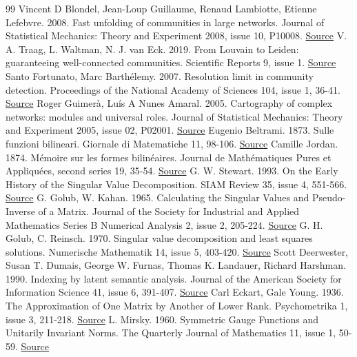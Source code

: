 \documentclass[10pt,letterpaper]{article}
\begin{document}
\begin{thebibliography}{99}
Vincent D Blondel, Jean-Loup Guillaume, Renaud Lambiotte, Etienne Lefebvre. 2008. Fast unfolding of communities in large networks. Journal of Statistical Mechanics: Theory and Experiment 2008, issue 10, P10008. \href{https://doi.org/10.1088/1742-5468/2008/10/P10008}{Source}
V. A. Traag, L. Waltman, N. J. van Eck. 2019. From Louvain to Leiden: guaranteeing well-connected communities. Scientific Reports 9, issue 1. \href{https://doi.org/10.1038/s41598-019-41695-z}{Source}
Santo Fortunato, Marc Barthélemy. 2007. Resolution limit in community detection. Proceedings of the National Academy of Sciences 104, issue 1, 36-41. \href{https://doi.org/10.1073/pnas.0605965104}{Source}
Roger Guimerà, Luís A Nunes Amaral. 2005. Cartography of complex networks: modules and universal roles. Journal of Statistical Mechanics: Theory and Experiment 2005, issue 02, P02001. \href{https://doi.org/10.1088/1742-5468/2005/02/P02001}{Source}
Eugenio Beltrami. 1873. Sulle funzioni bilineari. Giornale di Matematiche 11, 98-106. \href{https://www-users.cse.umn.edu/~boley/publications/papers/Beltrami.pdf}{Source}
Camille Jordan. 1874. Mémoire sur les formes bilinéaires. Journal de Mathématiques Pures et Appliquées, second series 19, 35-54. \href{http://www.numdam.org/item/JMPA_1874_2_19__35_0/}{Source}
G. W. Stewart. 1993. On the Early History of the Singular Value Decomposition. SIAM Review 35, issue 4, 551-566. \href{https://doi.org/10.1137/1035134}{Source}
G. Golub, W. Kahan. 1965. Calculating the Singular Values and Pseudo-Inverse of a Matrix. Journal of the Society for Industrial and Applied Mathematics Series B Numerical Analysis 2, issue 2, 205-224. \href{https://doi.org/10.1137/0702016}{Source}
G. H. Golub, C. Reinsch. 1970. Singular value decomposition and least squares solutions. Numerische Mathematik 14, issue 5, 403-420. \href{https://doi.org/10.1007/BF02163027}{Source}
Scott Deerwester, Susan T. Dumais, George W. Furnas, Thomas K. Landauer, Richard Harshman. 1990. Indexing by latent semantic analysis. Journal of the American Society for Information Science 41, issue 6, 391-407. \href{https://doi.org/10.1002/%28SICI%291097-4571%28199009%2941:6%3C391::AID-ASI1%3E3.0.CO%3B2-9}{Source}
Carl Eckart, Gale Young. 1936. The Approximation of One Matrix by Another of Lower Rank. Psychometrika 1, issue 3, 211-218. \href{https://doi.org/10.1007/BF02288367}{Source}
L. Mirsky. 1960. Symmetric Gauge Functions and Unitarily Invariant Norms. The Quarterly Journal of Mathematics 11, issue 1, 50-59. \href{https://doi.org/10.1093/qmath/11.1.50}{Source}

\end{thebibliography}
\end{document}
